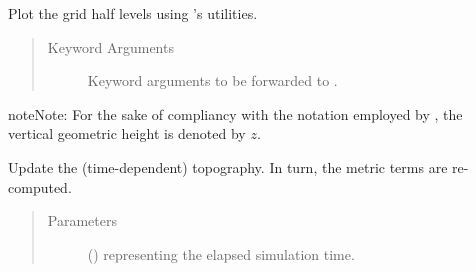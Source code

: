\documentclass[letterpaper,10pt,english]{sphinxmanual}
\begin{document}
\begin{fulllineitems}
\begin{fulllineitems}
\label{\detokenize{api:tasmania.grids.gal_chen.GalChen2d.plot}}
Plot the grid half levels using ’s utilities.
\begin{quote}\begin{description}
\item[{Keyword Arguments}] \leavevmode
{} \textendash{} Keyword arguments to be forwarded to .

\end{description}\end{quote}

\begin{sphinxadmonition}{note}{Note:}
For the sake of compliancy with the notation employed by ,
the vertical geometric height is denoted by \(z\).
\end{sphinxadmonition}

\end{fulllineitems}


\begin{fulllineitems}
\label{\detokenize{api:tasmania.grids.gal_chen.GalChen2d.update_topography}}
Update the (time-dependent) topography. In turn, the metric terms are re-computed.
\begin{quote}\begin{description}
\item[{Parameters}] \leavevmode
{} () \textendash{}  representing the elapsed simulation time.

\end{description}\end{quote}

\end{fulllineitems}


\end{fulllineitems}
\end{document}
